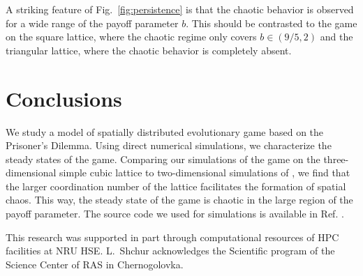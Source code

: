 \documentclass[a4paper]{jpconf}
\begin{document}
A striking feature of Fig.\ \ref{fig:persistence} is that the chaotic behavior is observed for a wide range of the payoff parameter $b$. This should be contrasted to the game on the square lattice, where the chaotic regime only covers $b\in (9/5, 2)$ and the triangular lattice, where the chaotic behavior is completely absent.


\section{Conclusions}

We study a model of spatially distributed evolutionary game based on the Prisoner's Dilemma. Using direct numerical simulations, we characterize the steady states of the game. Comparing our simulations of the game on the three-dimensional simple cubic lattice to two-dimensional simulations of \cite{Nowak1992, Nowak1993, Kolotev2018}, we find that the larger coordination number of the lattice facilitates the formation of spatial chaos. This way, the steady state of the game is chaotic in the large region of the payoff parameter.
The source code we used for simulations is available in Ref. \cite{github}. 

This research was supported in part through computational resources of HPC facilities at NRU HSE. L.~Shchur acknowledges the Scientific program of the Science Center of RAS in Chernogolovka.
\end{document}
